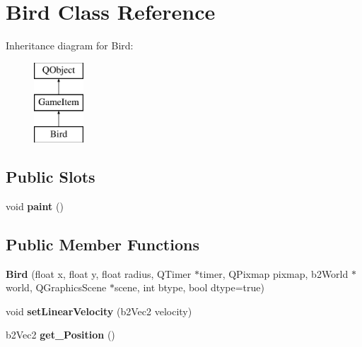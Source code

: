 \hypertarget{classBird}{\section{Bird Class Reference}
\label{classBird}
}
Inheritance diagram for Bird\-:\begin{figure}[H]
\begin{center}
\leavevmode
\includegraphics[height=3.000000cm]{classBird}
\end{center}
\end{figure}
\subsection*{Public Slots}
\begin{DoxyCompactItemize}
\item 
\hypertarget{classBird_a2840e2e74ef059b11043ce7306ed7a25}{void {\bfseries paint} ()}\label{classBird_a2840e2e74ef059b11043ce7306ed7a25}

\end{DoxyCompactItemize}
\subsection*{Public Member Functions}
\begin{DoxyCompactItemize}
\item 
\hypertarget{classBird_ae01d2eb85f6f900c8509fac8c30dce6e}{{\bfseries Bird} (float x, float y, float radius, Q\-Timer $\ast$timer, Q\-Pixmap pixmap, b2\-World $\ast$world, Q\-Graphics\-Scene $\ast$scene, int btype, bool dtype=true)}\label{classBird_ae01d2eb85f6f900c8509fac8c30dce6e}

\item 
\hypertarget{classBird_a30a2480db9cbbbc498ab3ce651e579d8}{void {\bfseries set\-Linear\-Velocity} (b2\-Vec2 velocity)}\label{classBird_a30a2480db9cbbbc498ab3ce651e579d8}

\item 
\hypertarget{classBird_ac24711e054b0af39d40aa4ecd8b7e477}{b2\-Vec2 {\bfseries get\-\_\-\-Position} ()}\label{classBird_ac24711e054b0af39d40aa4ecd8b7e477}

\end{DoxyCompactItemize}
